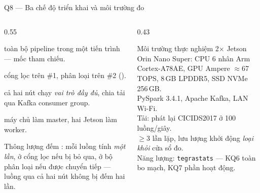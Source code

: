 \documentclass[aspectratio=169, 11pt]{beamer}
\begin{document}
\begin{frame}[label=bk-modes]{Q8 --- Ba chế độ triển khai và môi trường đo}
  \begin{columns}[T]
    \begin{column}{0.55\textwidth}
      \begin{description}\small
        \item[Đơn nút] toàn bộ pipeline trong một tiến trình --- mốc tham chiếu.
        \item[A: Tách pipeline] cổng lọc trên \#1, phân loại trên \#2
              ().
        \item[B: Mở rộng ngang] cả hai nút chạy \emph{vai trò đầy đủ}, chia tải
              qua Kafka consumer group.
        \item[C: Cụm Spark] máy chủ làm master, hai Jetson làm worker.
      \end{description}
      \vspace{0.2em}
      \footnotesize Thông lượng đếm : mỗi luồng
      tính \emph{một lần}, ở cổng lọc nếu bị bỏ qua, ở bộ phân loại nếu được chuyển
      tiếp --- luồng qua cả hai nút không bị đếm hai lần.
    \end{column}
    \begin{column}{0.43\textwidth}
      \begin{block}{Môi trường thực nghiệm}
        \footnotesize
        2$\times$ Jetson Orin Nano Super: CPU 6 nhân Arm Cortex-A78AE, GPU
        Ampere $\approx$67 TOPS, 8\,GB LPDDR5, SSD NVMe 256\,GB.\\[0.3em]
        PySpark 3.4.1, Apache Kafka, LAN Wi-Fi.\\[0.3em]
        Tải: phát lại CICIDS2017 ở 100 luồng/giây.\\[0.3em]
        $\geq$3 lần lặp, lưu lượng khởi động \emph{loại khỏi} cửa sổ đo.\\[0.3em]
        Năng lượng: \texttt{tegrastats} --- KQ6 toàn bo mạch, KQ7 phần hoạt động.
      \end{block}
    \end{column}
  \end{columns}
\end{frame}
\end{document}

